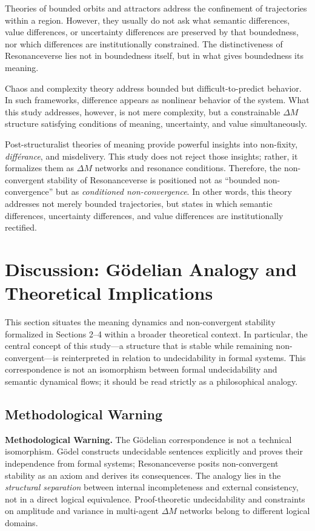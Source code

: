 \documentclass[11pt,a4paper]{article}
\theoremstyle{definition}
\begin{document}
Theories of bounded orbits and attractors address the confinement of trajectories within a region. However, they usually do not ask what semantic differences, value differences, or uncertainty differences are preserved by that boundedness, nor which differences are institutionally constrained. The distinctiveness of Resonanceverse lies not in boundedness itself, but in what gives boundedness its meaning.

Chaos and complexity theory address bounded but difficult-to-predict behavior. In such frameworks, difference appears as nonlinear behavior of the system. What this study addresses, however, is not mere complexity, but a constrainable $\Delta M$ structure satisfying conditions of meaning, uncertainty, and value simultaneously.

Post-structuralist theories of meaning provide powerful insights into non-fixity, \textit{différance}, and misdelivery. This study does not reject those insights; rather, it formalizes them as $\Delta M$ networks and resonance conditions. Therefore, the non-convergent stability of Resonanceverse is positioned not as ``bounded non-convergence'' but as \textit{conditioned non-convergence}. In other words, this theory addresses not merely bounded trajectories, but states in which semantic differences, uncertainty differences, and value differences are institutionally rectified.

\section{Discussion: Gödelian Analogy and Theoretical Implications}

This section situates the meaning dynamics and non-convergent stability formalized in Sections 2--4 within a broader theoretical context. In particular, the central concept of this study---a structure that is stable while remaining non-convergent---is reinterpreted in relation to undecidability in formal systems. This correspondence is not an isomorphism between formal undecidability and semantic dynamical flows; it should be read strictly as a philosophical analogy.

\subsection{Methodological Warning}

\textbf{Methodological Warning.} The Gödelian correspondence is not a technical isomorphism. Gödel constructs undecidable sentences explicitly and proves their independence from formal systems; Resonanceverse posits non-convergent stability as an axiom and derives its consequences. The analogy lies in the \textit{structural separation} between internal incompleteness and external consistency, not in a direct logical equivalence. Proof-theoretic undecidability and constraints on amplitude and variance in multi-agent $\Delta M$ networks belong to different logical domains.
\end{document}
